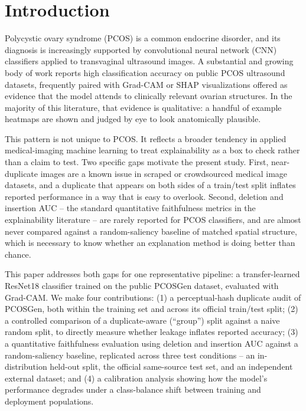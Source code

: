 \documentclass[conference]{IEEEtran}
\begin{document}
\section{Introduction}

Polycystic ovary syndrome (PCOS) is a common endocrine disorder, and its diagnosis is increasingly supported by convolutional neural network (CNN) classifiers applied to transvaginal ultrasound images. A substantial and growing body of work reports high classification accuracy on public PCOS ultrasound datasets, frequently paired with Grad-CAM or SHAP visualizations offered as evidence that the model attends to clinically relevant ovarian structures. In the majority of this literature, that evidence is qualitative: a handful of example heatmaps are shown and judged by eye to look anatomically plausible.

This pattern is not unique to PCOS. It reflects a broader tendency in applied medical-imaging machine learning to treat explainability as a box to check rather than a claim to test. Two specific gaps motivate the present study. First, near-duplicate images are a known issue in scraped or crowdsourced medical image datasets, and a duplicate that appears on both sides of a train/test split inflates reported performance in a way that is easy to overlook. Second, deletion and insertion AUC -- the standard quantitative faithfulness metrics in the explainability literature -- are rarely reported for PCOS classifiers, and are almost never compared against a random-saliency baseline of matched spatial structure, which is necessary to know whether an explanation method is doing better than chance.

This paper addresses both gaps for one representative pipeline: a transfer-learned ResNet18 classifier trained on the public PCOSGen dataset, evaluated with Grad-CAM. We make four contributions: (1) a perceptual-hash duplicate audit of PCOSGen, both within the training set and across its official train/test split; (2) a controlled comparison of a duplicate-aware (``group'') split against a naive random split, to directly measure whether leakage inflates reported accuracy; (3) a quantitative faithfulness evaluation using deletion and insertion AUC against a random-saliency baseline, replicated across three test conditions -- an in-distribution held-out split, the official same-source test set, and an independent external dataset; and (4) a calibration analysis showing how the model's performance degrades under a class-balance shift between training and deployment populations.
\end{document}
